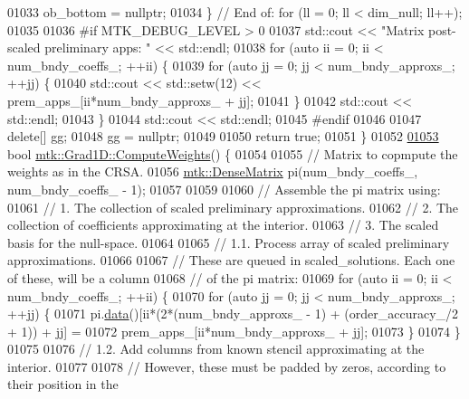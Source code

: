 \begin{DoxyCode}
{{01033     ob\_bottom = \textcolor{keyword}{nullptr};
01034   \} \textcolor{comment}{// End of: for (ll = 0; ll < dim\_null; ll++);}
01035 
01036 \textcolor{preprocessor}{  #if MTK\_DEBUG\_LEVEL > 0}
01037   std::cout << \textcolor{stringliteral}{"Matrix post-scaled preliminary apps: "} << std::endl;
01038   \textcolor{keywordflow}{for} (\textcolor{keyword}{auto} ii = 0; ii < num\_bndy\_coeffs\_; ++ii) \{
01039     \textcolor{keywordflow}{for} (\textcolor{keyword}{auto} jj = 0; jj < num\_bndy\_approxs\_; ++jj) \{
01040       std::cout << std::setw(12) << prem\_apps\_[ii*num\_bndy\_approxs\_ + jj];
01041     \}
01042     std::cout << std::endl;
01043   \}
01044   std::cout << std::endl;
01045 \textcolor{preprocessor}{  #endif}
01046 
01047   \textcolor{keyword}{delete}[] gg;
01048   gg = \textcolor{keyword}{nullptr};
01049 
01050   \textcolor{keywordflow}{return} \textcolor{keyword}{true};
01051 \}
01052 
\hypertarget{mtk__grad__1d_8cc_source_l01053}{}\hyperlink{classmtk_1_1Grad1D_a224082617751864bffca9bfe494c36d5}{01053} \textcolor{keywordtype}{bool} \hyperlink{classmtk_1_1Grad1D_a224082617751864bffca9bfe494c36d5}{mtk::Grad1D::ComputeWeights}() \{
01054 
01055   \textcolor{comment}{// Matrix to copmpute the weights as in the CRSA.}
01056   \hyperlink{classmtk_1_1DenseMatrix}{mtk::DenseMatrix} pi(num\_bndy\_coeffs\_, num\_bndy\_coeffs\_ - 1);
01057 
01059 
01060   \textcolor{comment}{// Assemble the pi matrix using:}
01061   \textcolor{comment}{// 1. The collection of scaled preliminary approximations.}
01062   \textcolor{comment}{// 2. The collection of coefficients approximating at the interior.}
01063   \textcolor{comment}{// 3. The scaled basis for the null-space.}
01064 
01065   \textcolor{comment}{// 1.1. Process array of scaled preliminary approximations.}
01066 
01067   \textcolor{comment}{// These are queued in scaled\_solutions. Each one of these, will be a column}
01068   \textcolor{comment}{// of the pi matrix:}
01069   \textcolor{keywordflow}{for} (\textcolor{keyword}{auto} ii = 0; ii < num\_bndy\_coeffs\_; ++ii) \{
01070     \textcolor{keywordflow}{for} (\textcolor{keyword}{auto} jj = 0; jj < num\_bndy\_approxs\_; ++jj) \{
01071       pi.\hyperlink{classmtk_1_1DenseMatrix_a0c33b8a9e01d157c61ddbdf807c25d84}{data}()[ii*(2*(num\_bndy\_approxs\_ - 1) + (order\_accuracy\_/2 + 1)) + jj] =
01072         prem\_apps\_[ii*num\_bndy\_approxs\_ + jj];
01073     \}
01074   \}
01075 
01076   \textcolor{comment}{// 1.2. Add columns from known stencil approximating at the interior.}
01077 
01078   \textcolor{comment}{// However, these must be padded by zeros, according to their position in the}
}}
\end{DoxyCode}
